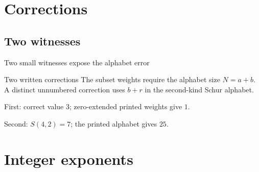 \documentclass{beamer}
\begin{document}
\section{Corrections}
\subsection{Two witnesses}
\begin{frame}{Two small witnesses expose the alphabet error}
  \begin{block}{Two written corrections}
    The subset weights require the alphabet size $N=a+b$. A distinct unnumbered correction uses $b+r$ in the second-kind Schur alphabet.\par\smallskip
    First: correct value $3$; zero-extended printed weights give $1$.\par
    Second: $S(4,2)=7$; the printed alphabet gives $25$.
  \end{block}
\end{frame}
\section{Integer exponents}
\end{document}
